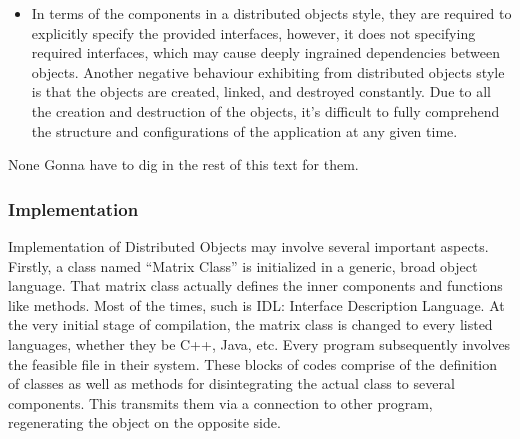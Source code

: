{\begin{itemize}
        \item In terms of the components in a distributed objects style,
            they are required to explicitly specify the provided interfaces,
            however, it does not specifying required interfaces, which may
            cause deeply ingrained dependencies between objects. Another
            negative behaviour exhibiting from distributed objects style is
            that the objects are created, linked, and destroyed constantly. Due
            to all the creation and destruction of the objects, it’s difficult
            to fully comprehend the structure and configurations of the
            application at any given time.
\end{itemize}}

\begin{nfps}
\item[None] Gonna have to dig in the rest of this text for them.
\end{nfps}

\subsubsection{Implementation}

Implementation of Distributed Objects may involve several important
aspects. Firstly, a class named “Matrix Class” is initialized in a generic,
broad object language. That matrix class actually defines the inner components
and functions like methods. Most of the times, such is IDL: Interface
Description Language.
At the very initial stage of compilation, the matrix class is changed to every
listed languages, whether they be C++, Java, etc. Every program subsequently
involves the feasible file in their system. These blocks of codes comprise of
the definition of classes as well as methods for disintegrating the actual
class to several components. This transmits them via a connection to other
program, regenerating the object on the opposite side.


